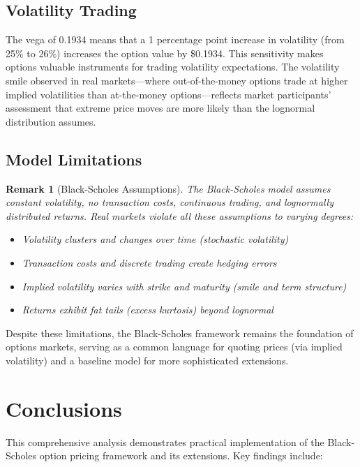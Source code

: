 \documentclass[a4paper, 11pt]{article}
\newtheorem{remark}{Remark}[section]
\begin{document}
\subsection{Volatility Trading}

The vega of 0.1934 means that a 1 percentage point increase in volatility (from 25\% to 26\%) increases the option value by \$0.1934. This sensitivity makes options valuable instruments for trading volatility expectations. The volatility smile observed in real markets—where out-of-the-money options trade at higher implied volatilities than at-the-money options—reflects market participants' assessment that extreme price moves are more likely than the lognormal distribution assumes.

\subsection{Model Limitations}

\begin{remark}[Black-Scholes Assumptions]
The Black-Scholes model assumes constant volatility, no transaction costs, continuous trading, and lognormally distributed returns. Real markets violate all these assumptions to varying degrees:
\begin{itemize}
\item Volatility clusters and changes over time (stochastic volatility)
\item Transaction costs and discrete trading create hedging errors
\item Implied volatility varies with strike and maturity (smile and term structure)
\item Returns exhibit fat tails (excess kurtosis) beyond lognormal
\end{itemize}
\end{remark}

Despite these limitations, the Black-Scholes framework remains the foundation of options markets, serving as a common language for quoting prices (via implied volatility) and a baseline model for more sophisticated extensions.

\section{Conclusions}

This comprehensive analysis demonstrates practical implementation of the Black-Scholes option pricing framework and its extensions. Key findings include:
\end{document}
